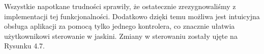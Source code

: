 Wszystkie napotkane trudności sprawiły, że ostatecznie zrezygnowaliśmy z implementacji tej funkcjonalności. Dodatkowo dzięki temu możliwa jest intuicyjna obsługa aplikacji za pomocą tylko jednego kontrolera, co znacznie ułatwia użytkownikowi sterowanie w jaskini. Zmiany w sterowaniu zostały ujęte na Rysunku 4.7.


